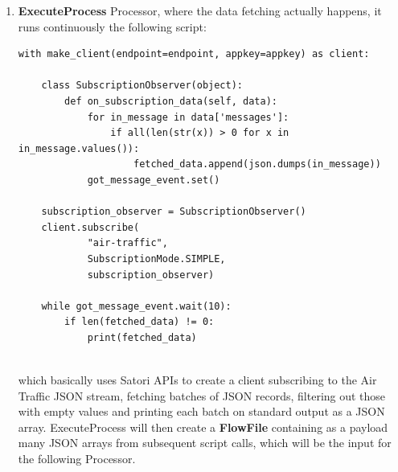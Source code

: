 \begin{enumerate}
    \item \textbf{ExecuteProcess} Processor, where the data fetching actually happens, it runs continuously the following script:
    
    \begin{code}
        \begin{verbatim}
with make_client(endpoint=endpoint, appkey=appkey) as client:
    
    class SubscriptionObserver(object):
        def on_subscription_data(self, data):
            for in_message in data['messages']:
                if all(len(str(x)) > 0 for x in in_message.values()):
                    fetched_data.append(json.dumps(in_message))
            got_message_event.set()
            
    subscription_observer = SubscriptionObserver()
    client.subscribe(
            "air-traffic",
            SubscriptionMode.SIMPLE,
            subscription_observer)
    
    while got_message_event.wait(10):
        if len(fetched_data) != 0:
            print(fetched_data)
     
        \end{verbatim}
    \end{code}
which basically uses Satori APIs to create a client subscribing to the Air Traffic JSON stream, fetching batches of JSON records, filtering out those with empty values and printing each batch on standard output as a JSON array. ExecuteProcess will then create a \textbf{FlowFile} containing as a payload many JSON arrays from subsequent script calls, which will be the input for the following Processor.


\end{enumerate}
